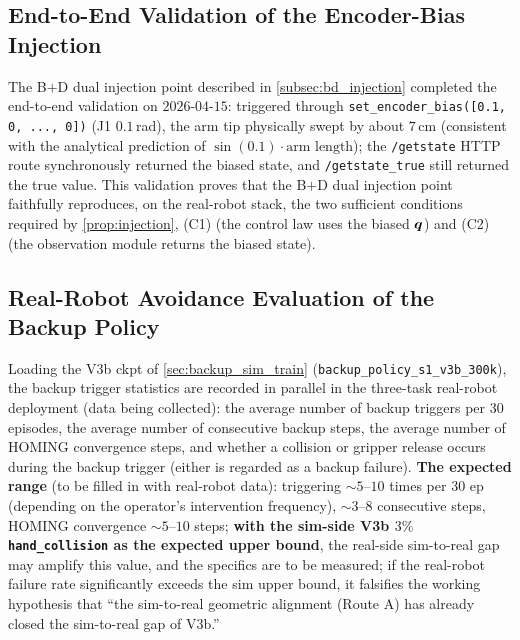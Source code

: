 \subsection{End-to-End Validation of the Encoder-Bias Injection}\label{subsec:exp_bias_injection}

The B$+$D dual injection point described in \cref{subsec:bd_injection} completed the end-to-end validation on $2026$-$04$-$15$: triggered through \texttt{set\_encoder\_bias([0.1, 0, ..., 0])} (J1 $0.1$\,rad), the arm tip physically swept by about $7$\,cm (consistent with the analytical prediction of $\sin(0.1) \cdot \text{arm length}$); the \texttt{/getstate} HTTP route synchronously returned the biased state, and \texttt{/getstate\_true} still returned the true value. This validation proves that the B$+$D dual injection point faithfully reproduces, on the real-robot stack, the two sufficient conditions required by \cref{prop:injection}, (C1) (the control law uses the biased $\bm{q}$) and (C2) (the observation module returns the biased state).

\subsection{Real-Robot Avoidance Evaluation of the Backup Policy}\label{subsec:exp_backup_real}

Loading the V3b ckpt of \cref{sec:backup_sim_train} (\texttt{backup\_policy\_s1\_v3b\_300k}), the backup trigger statistics are recorded in parallel in the three-task real-robot deployment (data being collected): the average number of backup triggers per $30$ episodes, the average number of consecutive backup steps, the average number of HOMING convergence steps, and whether a collision or gripper release occurs during the backup trigger (either is regarded as a backup failure). \textbf{The expected range} (to be filled in with real-robot data): triggering $\sim 5$--$10$ times per $30$ ep (depending on the operator's intervention frequency), $\sim 3$--$8$ consecutive steps, HOMING convergence $\sim 5$--$10$ steps; \textbf{with the sim-side V3b $3\%$ \texttt{hand\_collision} as the expected upper bound}, the real-side sim-to-real gap may amplify this value, and the specifics are to be measured; if the real-robot failure rate significantly exceeds the sim upper bound, it falsifies the working hypothesis that ``the sim-to-real geometric alignment (Route A) has already closed the sim-to-real gap of V3b.''

